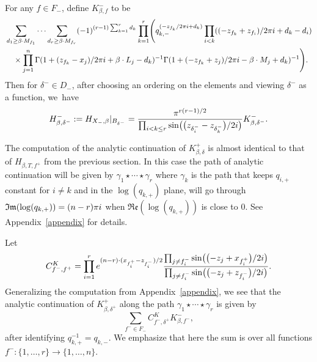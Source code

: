 \documentclass[11pt]{article}
\numberwithin{equation}{section}
\numberwithin{equation}{section}
\newcommand{\MB}{M}
\newcommand{\LB}{L}
\newcommand{\z}{z}
\newcommand{\x}{x}
\begin{document}
For any $f \in F_-$, define
 $K^{-}_{\beta, f}$ to be
\begin{align*}
&\sum_{d_1 \geq \beta \cdot \MB_{f_1}} \cdots \sum _{d_r \geq \beta \cdot \MB_{f_r}} (-1)^{(r-1) \sum_{k=1}^r d_k}\prod_{k=1}^r \Biggl(q_{k, -}^{(- \z_{f_k}/2\pi {\rm i} + d_k)}
\prod_{i < k} ( (- \z_{f_k} + \z_{f_i} )/2 \pi {\rm i} + d_k - d_i )
 \\
&\quad{}\times \prod_{j=1}^n\Gamma (1+ ( \z_{f_k}-\x_j )/2 \pi {\rm i}+\beta\cdot \LB_j-d_k )^{-1}\Gamma (1+ (-\z_{f_k}+\z_j )/2 \pi {\rm i}-\beta\cdot \MB_j+d_k )^{-1}\Biggr).
\end{align*}
Then for $\delta^- \in D_-$, after choosing an ordering on the elements and viewing $\delta^-$ as a function, we~have
\begin{equation}\label{HBM}
 H^{-}_{\beta, \delta^-} := H_{X_-, \beta}|_{B_{\delta^-}} =
\frac{\pi^{r(r-1)/2}}{\prod_{i<k\leq r} \sin\bigl(\bigl(\z_{\delta^-_i} - \z_{\delta^-_k}\bigr)/2{\rm i}\bigr)} K^{-}_{\beta, \delta^-}.
\end{equation}



The computation of the analytic continuation of $K_{\beta,\delta}^{+}$ is almost identical to that of $H_{\beta, T, f^+}$ from the previous section.
In this case the path of analytic continuation will be given by $\gamma_1 \star \cdots \star \gamma_r$ where
$\gamma_k$
is the path that keeps $q_{i, +}$ constant for $i \neq k$ and in the
 $\log(q_{k, +})$ plane, will go through $\mathfrak{Im}(\log(q_{k, +})) = (n-r)\pi {\rm i}$ when $\mathfrak{Re}(\log(q_{k,+}))$ is close to 0. See Appendix~\ref{appendix} for details.

Let
\[
C^K_{f^-, f^+} = \prod_{i=1}^r {\rm e}^{ (n-r)\cdot ( \x_{f^+_i}-\z_{f^-_i})/2 }\frac{ \prod_{j\neq {f^-_i}} \sin\bigl( \bigl(-\z_j+\x_{f^+_i}\bigr)/2 {\rm i}\bigr) }{\prod_{j \neq {f^-_i}}\sin\bigl(\bigl(-\z_j + \z_{f^-_i}\bigr)/2 {\rm i}\bigr)}.
\]
Generalizing the computation from Appendix~\ref{appendix},
we see that the analytic continuation of $K^{+}_{\beta, \delta^+}$ along the path
$\gamma_1 \star \cdots \star \gamma_r$ is given by
\begin{equation}\label{ancon}\sum_{f^- \in F_-} C^K_{f^-, \delta^+} K^{-}_{\beta, f^-},\end{equation}
after identifying $q_{k, +}^{-1} = q_{k, -}$. We emphasize that here the sum is over all functions $f^-\colon \{1, \dots, r\} \allowbreak \to \{1, \dots, n\}$.
\end{document}
